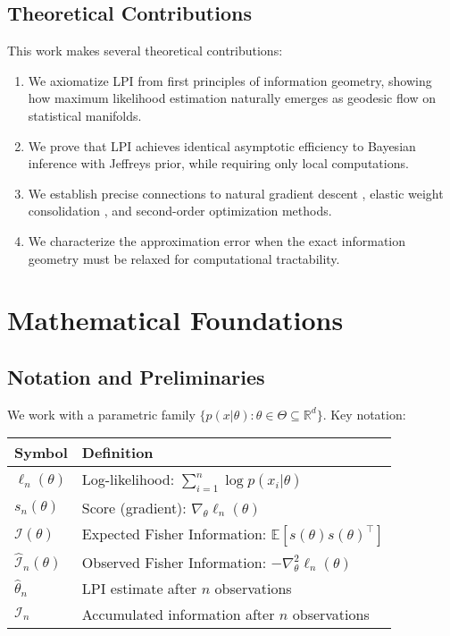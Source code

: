 \documentclass[11pt]{article}
\begin{document}
\subsection{Theoretical Contributions}
This work makes several theoretical contributions:
\begin{enumerate}
\item We axiomatize LPI from first principles of information geometry, showing how maximum likelihood estimation naturally emerges as geodesic flow on statistical manifolds.
\item We prove that LPI achieves identical asymptotic efficiency to Bayesian inference with Jeffreys prior, while requiring only local computations.
\item We establish precise connections to natural gradient descent \cite{amari1998natural}, elastic weight consolidation \cite{kirkpatrick2017overcoming}, and second-order optimization methods.
\item We characterize the approximation error when the exact information geometry must be relaxed for computational tractability.
\end{enumerate}

\section{Mathematical Foundations}

\subsection{Notation and Preliminaries}

We work with a parametric family $\{p(x|\theta) : \theta \in \Theta \subseteq \mathbb{R}^d\}$. Key notation:

\begin{center}
\begin{tabular}{ll}
\toprule
\textbf{Symbol} & \textbf{Definition} \\
\midrule
$\ell_n(\theta)$ & Log-likelihood: $\sum_{i=1}^n \log p(x_i|\theta)$ \\
$s_n(\theta)$ & Score (gradient): $\nabla_\theta \ell_n(\theta)$ \\
$\mathcal{I}(\theta)$ & Expected Fisher Information: $\mathbb{E}[s(\theta)s(\theta)^\top]$ \\
$\hat{\mathcal{I}}_n(\theta)$ & Observed Fisher Information: $-\nabla^2_\theta \ell_n(\theta)$ \\
$\hat{\theta}_n$ & LPI estimate after $n$ observations \\
$\mathcal{I}_n$ & Accumulated information after $n$ observations \\
\bottomrule
\end{tabular}
\end{center}
\end{document}
